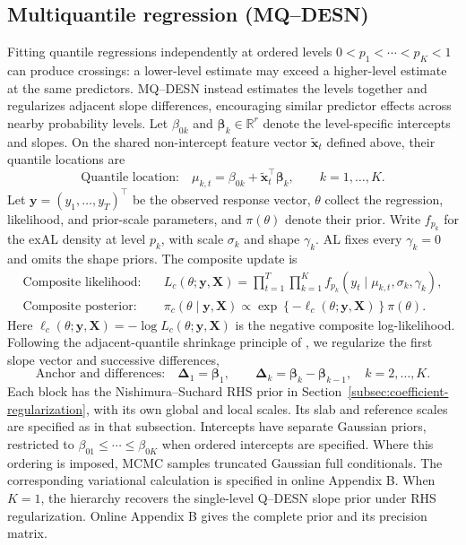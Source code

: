 \documentclass[12pt,letterpaper]{article}
\numberwithin{equation}{section}
\newcommand{\R}{\mathbb{R}}
\newcommand{\vect}[1]{\bm{#1}}
\newcommand{\mat}[1]{\bm{#1}}
\begin{document}
\subsection{Multiquantile regression (MQ--DESN)}
\label{subsec:joint-qdesn}

Fitting quantile regressions independently at ordered levels
\(0<p_1<\cdots<p_K<1\) can produce crossings: a lower-level estimate may
exceed a higher-level estimate at the same predictors. MQ--DESN instead
estimates the levels together and regularizes adjacent slope differences,
encouraging similar predictor effects across nearby probability levels.
Let \(\beta_{0k}\) and \(\vect\beta_k\in\R^r\) denote the level-specific
intercepts and slopes. On the shared non-intercept feature vector
\(\tilde{\vect x}_t\) defined above, their quantile locations are
\begin{equation}
\text{Quantile location:}\quad
\mu_{k,t}=\beta_{0k}+\tilde{\vect x}_t^\top\vect\beta_k,
\qquad k=1,\ldots,K.
\label{eq:joint-qdesn-readout}
\end{equation}
Let \(\vect y=(y_1,\ldots,y_T)^\top\) be the observed response vector,
\(\theta\) collect the regression, likelihood, and prior-scale parameters,
and \(\pi(\theta)\) denote their prior. Write \(f_{p_k}\) for the exAL
density at level \(p_k\), with scale \(\sigma_k\) and shape \(\gamma_k\).
AL fixes every \(\gamma_k=0\) and omits the shape priors. The composite
update is
\begin{equation}
\begin{aligned}
\text{Composite likelihood:}\quad
&L_c(\theta;\vect y,\mat X)
 =\prod_{t=1}^T\prod_{k=1}^K
 f_{p_k}(y_t\mid\mu_{k,t},\sigma_k,\gamma_k),\\
\text{Composite posterior:}\quad
&\pi_c(\theta\mid\vect y,\mat X)
 \propto\exp\!\left\{-\ell_c(\theta;\vect y,\mat X)\right\}\pi(\theta).
\end{aligned}
\label{eq:joint-composite-posterior-main}
\end{equation}
Here \(\ell_c(\theta;\vect y,\mat X)=-\log L_c(\theta;\vect y,\mat X)\)
is the negative composite log-likelihood. Following the adjacent-quantile
shrinkage principle of \citet{KohnsSzendrei2025QVP}, we regularize the first
slope vector and successive differences,
\[
\text{Anchor and differences:}\quad
\vect\Delta_1=\vect\beta_1,\qquad
\vect\Delta_k=\vect\beta_k-\vect\beta_{k-1},\quad k=2,\ldots,K.
\]
Each block has the Nishimura--Suchard RHS prior in
Section~\ref{subsec:coefficient-regularization}, with its own global and
local scales. Its slab and reference scales are specified as in that
subsection. Intercepts have separate Gaussian priors, restricted to
\(\beta_{01}\le\cdots\le\beta_{0K}\) when ordered intercepts are specified.
Where this ordering is imposed, MCMC samples truncated Gaussian full
conditionals. The corresponding variational calculation is specified in
online Appendix B.
When \(K=1\), the hierarchy
recovers the single-level Q--DESN slope prior under RHS regularization.
Online Appendix B gives the complete prior and its precision matrix.
\end{document}
